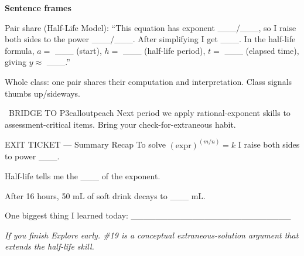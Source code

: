\documentclass[11pt]{article}
\begin{document}

\begin{sentenceframebox}
\textbf{Sentence frames}

Pair share (Half-Life Model): ``This equation has exponent \_\_\_/\_\_\_, so I raise both sides to the power \_\_\_/\_\_\_. After simplifying I get \_\_\_. In the half-life formula, \(a =\) \_\_\_ (start), \(h =\) \_\_\_ (half-life period), \(t =\) \_\_\_ (elapsed time), giving \(y \approx\) \_\_\_.''

Whole class: one pair shares their computation and interpretation. Class signals thumbs up/sideways.
\end{sentenceframebox}

\begin{callout}{\IconSearch\ BRIDGE TO P3}{calloutpeach}
Next period we apply rational-exponent skills to assessment-critical items. Bring your check-for-extraneous habit.
\end{callout}


\begin{summaryexitbox}{EXIT TICKET --- Summary Recap}
To solve \((\text{expr})^{(m/n)} = k\) I raise both sides to power \_\_\_.

Half-life tells me the \_\_\_ of the exponent.

After 16 hours, 50 mL of soft drink decays to \_\_\_ mL.

One biggest thing I learned today: \_\_\_\_\_\_\_\_\_\_\_\_\_\_\_\_\_\_\_\_\_\_\_\_\_\_
\end{summaryexitbox}

\clearpage

\textit{If you finish Explore early. \#19 is a conceptual extraneous-solution argument that extends the half-life skill.}

\end{document}
